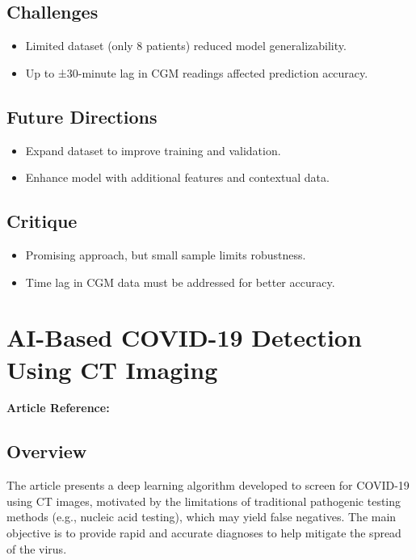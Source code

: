 \subsection*{Challenges}
\begin{itemize}
    \item Limited dataset (only 8 patients) reduced model generalizability.
    \item Up to ±30-minute lag in CGM readings affected prediction accuracy.
\end{itemize}

\subsection*{Future Directions}
\begin{itemize}
    \item Expand dataset to improve training and validation.
    \item Enhance model with additional features and contextual data.
\end{itemize}

\subsection*{Critique}
\begin{itemize}
    \item Promising approach, but small sample limits robustness.
    \item Time lag in CGM data must be addressed for better accuracy.
\end{itemize}



\section{AI-Based COVID-19 Detection Using CT Imaging}
\textbf{Article Reference:} \cite{wangDeepLearningAlgorithm2021}

\subsection*{Overview}
The article presents a deep learning algorithm developed to screen for COVID-19 using CT images, motivated by the limitations of traditional pathogenic testing methods (e.g., nucleic acid testing), which may yield false negatives. The main objective is to provide rapid and accurate diagnoses to help mitigate the spread of the virus.


